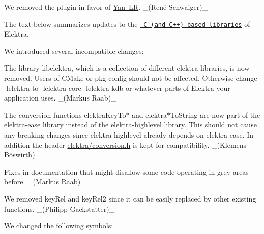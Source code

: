 \begin{DoxyItemize}
\item We removed the plugin in favor of \mbox{\hyperlink{autotoc_md861_src_plugins_yanlr_README_md}{Yan LR}}. \+\_\+(René Schwaiger)\+\_\+
\end{DoxyItemize}

The text below summarizes updates to the \href{https://www.libelektra.org/libraries/readme}{\texttt{ C (and C++)-\/based libraries}} of Elektra.

We introduced several incompatible changes\+:


\begin{DoxyItemize}
\item The library {\ttfamily libelektra}, which is a collection of different elektra libraries, is now removed. Users of C\+Make or pkg-\/config should not be affected. Otherwise change {\ttfamily -\/lelektra} to {\ttfamily -\/lelektra-\/core -\/lelektra-\/kdb} or whatever parts of Elektra your application uses. \+\_\+(\+Markus Raab)\+\_\+
\item The conversion functions {\ttfamily elektra\+Key\+To$\ast$} and {\ttfamily elektra$\ast$\+To\+String} are now part of the {\ttfamily elektra-\/ease} library instead of the {\ttfamily elektra-\/highlevel} library. This should not cause any breaking changes since {\ttfamily elektra-\/highlevel} already depends on {\ttfamily elektra-\/ease}. In addition the header {\ttfamily \mbox{\hyperlink{conversion_8h}{elektra/conversion.\+h}}} is kept for compatibility. \+\_\+(Klemens Böswirth)\+\_\+
\item Fixes in documentation that might disallow some code operating in grey areas before. \+\_\+(\+Markus Raab)\+\_\+
\item We removed {\ttfamily key\+Rel} and {\ttfamily key\+Rel2} since it can be easily replaced by other existing functions. \+\_\+(\+Philipp Gackstatter)\+\_\+
\end{DoxyItemize}

We changed the following symbols\+:



